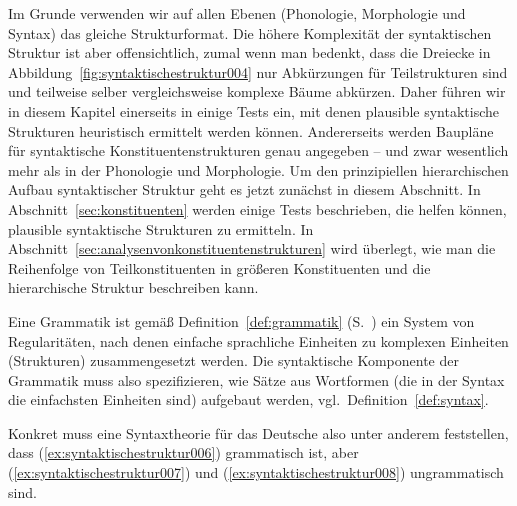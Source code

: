 Im Grunde verwenden wir auf allen Ebenen (Phonologie, Morphologie und Syntax) das gleiche Strukturformat.
Die höhere Komplexität der syntaktischen Struktur ist aber offensichtlich, zumal wenn man bedenkt, dass die Dreiecke in Abbildung~\ref{fig:syntaktischestruktur004} nur Abkürzungen für Teilstrukturen sind und teilweise selber vergleichsweise komplexe Bäume abkürzen.
Daher führen wir in diesem Kapitel einerseits in einige Tests ein, mit denen plausible syntaktische Strukturen heuristisch ermittelt werden können.
Andererseits werden Baupläne für syntaktische Konstituentenstrukturen genau angegeben -- und zwar wesentlich mehr als in der Phonologie und Morphologie.
Um den prinzipiellen hierarchischen Aufbau syntaktischer Struktur geht es jetzt zunächst in diesem Abschnitt.
In Abschnitt~\ref{sec:konstituenten} werden einige Tests beschrieben, die helfen können, plausible syntaktische Strukturen zu ermitteln.
In Abschnitt~\ref{sec:analysenvonkonstituentenstrukturen} wird überlegt, wie man die Reihenfolge von Teilkonstituenten in größeren Konstituenten und die hierarchische Struktur beschreiben kann.


Eine Grammatik ist gemäß Definition~\ref{def:grammatik} (S.~\pageref{def:grammatik}) ein System von Regularitäten, nach denen einfache sprachliche Einheiten zu komplexen Einheiten (Strukturen) zusammengesetzt werden.
Die syntaktische Komponente der Grammatik muss also spezifizieren, wie Sätze aus Wortformen (die in der Syntax die einfachsten Einheiten sind) aufgebaut werden, vgl.\ Definition~\ref{def:syntax}.


Konkret muss eine Syntaxtheorie für das Deutsche also unter anderem feststellen, dass (\ref{ex:syntaktischestruktur006}) grammatisch ist, aber (\ref{ex:syntaktischestruktur007}) und (\ref{ex:syntaktischestruktur008}) ungrammatisch sind.

\begin{exe}
  \ex\label{ex:syntaktischestruktur005}
  \begin{xlist}
  \end{xlist}
\end{exe}

